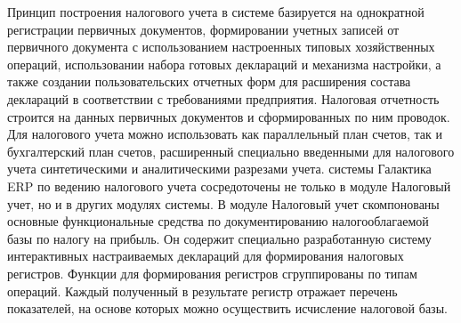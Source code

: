 \documentclass[14pt,a4paper]{reportmod}
\begin{document}
Принцип построения налогового учета в системе базируется на однократной регистрации первичных документов, формировании учетных записей от первичного документа с использованием настроенных типовых хозяйственных операций, использовании набора готовых деклараций и механизма настройки, а также создании пользовательских отчетных форм для расширения состава деклараций в соответствии с требованиями предприятия. Налоговая отчетность строится на данных первичных документов и сформированных по ним проводок. Для налогового учета можно использовать как параллельный план счетов, так и бухгалтерский план счетов, расширенный специально введенными для налогового учета синтетическими и аналитическими разрезами учета.
 системы Галактика ERP по ведению налогового учета сосредоточены не только в модуле Налоговый учет, но и в других модулях системы. В модуле Налоговый учет скомпонованы основные функциональные средства по документированию налогооблагаемой базы по налогу на прибыль. Он содержит специально разработанную систему интерактивных настраиваемых деклараций для формирования налоговых регистров. Функции для формирования регистров сгруппированы по типам операций. Каждый полученный в результате регистр отражает перечень показателей, на основе которых можно осуществить исчисление налоговой базы.
\end{document}
